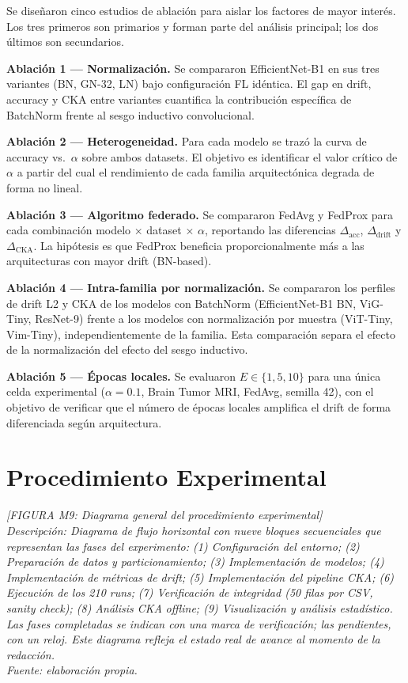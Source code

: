 Se diseñaron cinco estudios de ablación para aislar los factores de mayor interés. Los tres
primeros son primarios y forman parte del análisis principal; los dos últimos son secundarios.

\textbf{Ablación 1 — Normalización.} Se compararon EfficientNet-B1 en sus tres variantes (BN,
GN-32, LN) bajo configuración FL idéntica. El gap en drift, accuracy y CKA entre variantes
cuantifica la contribución específica de BatchNorm frente al sesgo inductivo convolucional.

\textbf{Ablación 2 — Heterogeneidad.} Para cada modelo se trazó la curva de accuracy vs.\
$\alpha$ sobre ambos datasets. El objetivo es identificar el valor crítico de $\alpha$ a
partir del cual el rendimiento de cada familia arquitectónica degrada de forma no lineal.

\textbf{Ablación 3 — Algoritmo federado.} Se compararon FedAvg y FedProx para cada
combinación modelo × dataset × $\alpha$, reportando las diferencias $\Delta_{\text{acc}}$,
$\Delta_{\text{drift}}$ y $\Delta_{\text{CKA}}$. La hipótesis es que FedProx beneficia
proporcionalmente más a las arquitecturas con mayor drift (BN-based).

\textbf{Ablación 4 — Intra-familia por normalización.} Se compararon los perfiles de drift L2
y CKA de los modelos con BatchNorm (EfficientNet-B1 BN, ViG-Tiny, ResNet-9) frente a los
modelos con normalización por muestra (ViT-Tiny, Vim-Tiny), independientemente de la familia.
Esta comparación separa el efecto de la normalización del efecto del sesgo inductivo.

\textbf{Ablación 5 — Épocas locales.} Se evaluaron $E \in \{1, 5, 10\}$ para una única
celda experimental ($\alpha = 0.1$, Brain Tumor MRI, FedAvg, semilla 42), con el objetivo de
verificar que el número de épocas locales amplifica el drift de forma diferenciada según
arquitectura.

\section{Procedimiento Experimental}

\begin{center}
\textit{[FIGURA M9: Diagrama general del procedimiento experimental]}\\
\textit{Descripción: Diagrama de flujo horizontal con nueve bloques secuenciales que}
\textit{representan las fases del experimento: (1) Configuración del entorno; (2) Preparación}
\textit{de datos y particionamiento; (3) Implementación de modelos; (4) Implementación de}
\textit{métricas de drift; (5) Implementación del pipeline CKA; (6) Ejecución de los 210 runs;}
\textit{(7) Verificación de integridad (50 filas por CSV, sanity check); (8) Análisis CKA}
\textit{offline; (9) Visualización y análisis estadístico. Las fases completadas se indican con}
\textit{una marca de verificación; las pendientes, con un reloj. Este diagrama refleja el estado}
\textit{real de avance al momento de la redacción.}\\
\textit{Fuente: elaboración propia.}
\end{center}

